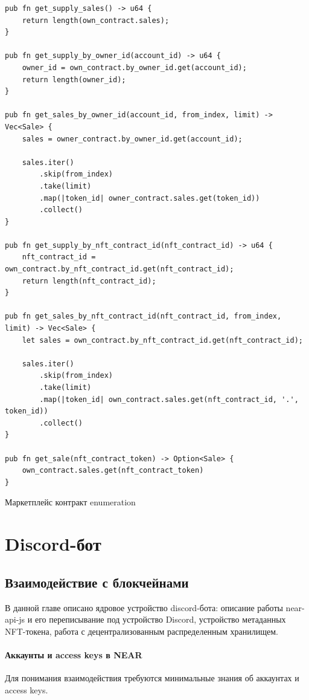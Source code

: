 \begin{listing}
\begin{verbatim}
pub fn get_supply_sales() -> u64 {
    return length(own_contract.sales);
}

pub fn get_supply_by_owner_id(account_id) -> u64 {
    owner_id = own_contract.by_owner_id.get(account_id);
    return length(owner_id);
}

pub fn get_sales_by_owner_id(account_id, from_index, limit) -> Vec<Sale> {
    sales = owner_contract.by_owner_id.get(account_id);

    sales.iter()
        .skip(from_index)
        .take(limit)
        .map(|token_id| owner_contract.sales.get(token_id))
        .collect()
}

pub fn get_supply_by_nft_contract_id(nft_contract_id) -> u64 {
    nft_contract_id = own_contract.by_nft_contract_id.get(nft_contract_id);
    return length(nft_contract_id);
}

pub fn get_sales_by_nft_contract_id(nft_contract_id, from_index, limit) -> Vec<Sale> {
    let sales = own_contract.by_nft_contract_id.get(nft_contract_id);

    sales.iter()
        .skip(from_index)
        .take(limit)
        .map(|token_id| own_contract.sales.get(nft_contract_id, '.', token_id))
        .collect()
}

pub fn get_sale(nft_contract_token) -> Option<Sale> {
    own_contract.sales.get(nft_contract_token)
}
\end{verbatim}
\caption{Маркетплейс контракт enumeration}
\label{marketplacecontract.enumeration}
\end{listing}

\section{Discord-бот}
\label{section.main.bot}

\subsection{Взаимодействие с блокчейнами}

В данной главе описано ядровое устройство discord-бота: описание работы near-api-js и его переписывание под устройство Discord, устройство метаданных NFT-токена, работа с децентрализованным распределенным хранилищем.

\paragraph{Аккаунты и access keys в NEAR}
Для понимания взаимодействия требуются минимальные знания об аккаунтах и access keys.

